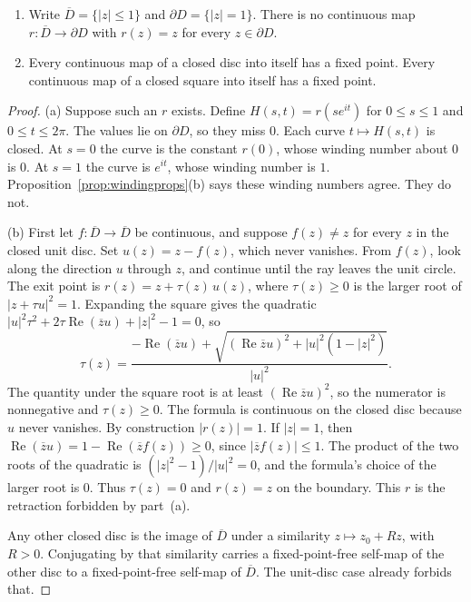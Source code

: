 \begin{theorem}\label{thm:brouwer}
\begin{enumerate}
\item[(a)] Write $\overline D=\{|z|\le1\}$ and $\partial D=\{|z|=1\}$. There is no continuous map $r:\overline D\to\partial D$ with $r(z)=z$ for every $z\in\partial D$.
\item[(b)] Every continuous map of a closed disc into itself has a fixed point. Every continuous map of a closed square into itself has a fixed point.
\end{enumerate}
\end{theorem}
\begin{proof}
(a) Suppose such an $r$ exists. Define $H(s,t)=r(se^{it})$ for $0\le s\le1$ and $0\le t\le 2\pi$. The values lie on $\partial D$, so they miss $0$. Each curve $t\mapsto H(s,t)$ is closed. At $s=0$ the curve is the constant $r(0)$, whose winding number about $0$ is $0$. At $s=1$ the curve is $e^{it}$, whose winding number is $1$. Proposition~\ref{prop:windingprops}(b) says these winding numbers agree. They do not.

(b) First let $f:\overline D\to\overline D$ be continuous, and suppose $f(z)\ne z$ for every $z$ in the closed unit disc. Set $u(z)=z-f(z)$, which never vanishes. From $f(z)$, look along the direction $u$ through $z$, and continue until the ray leaves the unit circle. The exit point is $r(z)=z+\tau(z)\,u(z)$, where $\tau(z)\ge0$ is the larger root of $|z+\tau u|^2=1$. Expanding the square gives the quadratic $|u|^2\tau^2+2\tau\operatorname{Re}(\overline z u)+|z|^2-1=0$, so
\[
\tau(z)=\frac{-\operatorname{Re}(\overline zu)+\sqrt{(\operatorname{Re}\overline zu)^2+|u|^2(1-|z|^2)}}{|u|^2}.
\]
The quantity under the square root is at least $(\operatorname{Re}\overline zu)^2$, so the numerator is nonnegative and $\tau(z)\ge0$. The formula is continuous on the closed disc because $u$ never vanishes. By construction $|r(z)|=1$. If $|z|=1$, then $\operatorname{Re}(\overline z u)=1-\operatorname{Re}(\overline z f(z))\ge0$, since $|\overline z f(z)|\le1$. The product of the two roots of the quadratic is $(|z|^2-1)/|u|^2=0$, and the formula's choice of the larger root is $0$. Thus $\tau(z)=0$ and $r(z)=z$ on the boundary. This $r$ is the retraction forbidden by part~(a).

Any other closed disc is the image of $\overline D$ under a similarity $z\mapsto z_0+Rz$, with $R>0$. Conjugating by that similarity carries a fixed-point-free self-map of the other disc to a fixed-point-free self-map of $\overline D$. The unit-disc case already forbids that.


\end{proof}
